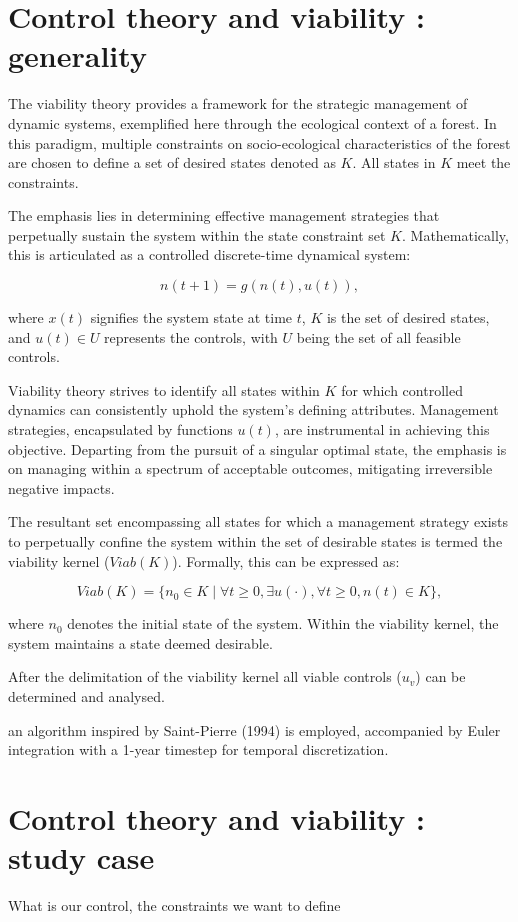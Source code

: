 \documentclass{article}
\begin{document}
\section{Control theory and viability : generality}

The viability theory provides a framework for the strategic management of dynamic systems, exemplified here through the ecological context of a forest. In this paradigm, multiple constraints on socio-ecological characteristics of the forest are chosen to define a set of desired states denoted as \(K\). All states in \(K\) meet the constraints.

The emphasis lies in determining effective management strategies that perpetually sustain the system within the state constraint set \(K\). Mathematically, this is articulated as a controlled discrete-time dynamical system:

\[
n(t+1) = g(n(t), u(t)),
\]

where \(x(t)\) signifies the system state at time \(t\), \(K\) is the set of desired states, and \(u(t) \in U\) represents the controls, with \(U\) being the set of all feasible controls.

Viability theory strives to identify all states within \(K\) for which controlled dynamics can consistently uphold the system's defining attributes. Management strategies, encapsulated by functions \(u(t)\), are instrumental in achieving this objective. Departing from the pursuit of a singular optimal state, the emphasis is on managing within a spectrum of acceptable outcomes, mitigating irreversible negative impacts.

The resultant set encompassing all states for which a management strategy exists to perpetually confine the system within the set of desirable states is termed the viability kernel (\(Viab(K)\)). Formally, this can be expressed as:

\[
Viab(K) = \{n_0 \in K \mid \forall t \geq 0, \exists u(\cdot), \forall t \geq 0, n(t) \in K\},
\]

where \(n_0\) denotes the initial state of the system. Within the viability kernel, the system maintains a state deemed desirable.

After the delimitation of the viability kernel all viable controls (\(u_v\)) can be determined and analysed.

an algorithm inspired by Saint-Pierre (1994) is employed, accompanied by Euler integration with a 1-year timestep for temporal discretization.

\section{Control theory and viability : study case}
What is our control, the constraints we want to define
\end{document}
